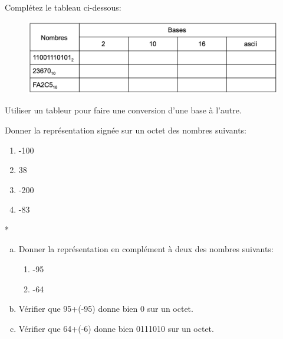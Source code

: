 \documentclass[11pt, a4paper]{book}
\begin{document}
\begin{exercice}
Complétez le tableau ci-dessous:



\end{exercice}

\begin{figure}[h]
\begin{center}
\includegraphics[scale=.3]{images/tableauconversion}
\end{center}
\end{figure}

\begin{exercice}
Utiliser un tableur pour faire une conversion d'une base à l'autre.
\end{exercice}


\begin{exercice}
Donner la représentation signée sur un octet des nombres suivants:
\begin{multicols}{2}
\begin{enumerate}
 	\item -100
 	\item 38
 	\item -200
 	\item -83
\end{enumerate}
\end{multicols}
\end{exercice}


\begin{exercice}*
\begin{enumerate}[a)]
\item Donner la représentation en complément à deux des nombres suivants:

\begin{enumerate}
\item -95
\item -64
\end{enumerate}

\item Vérifier que 95+(-95) donne bien 0 sur un octet.
\item Vérifier que 64+(-6) donne bien 0111010 sur un octet.
\end{enumerate}
\end{exercice}
\end{document}
